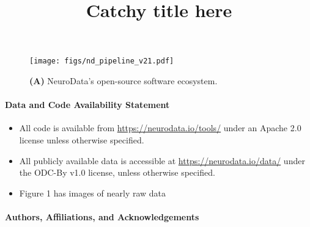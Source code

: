 \documentclass[11pt]{article}
\begin{document}
\title{Catchy title here}

\author{}

\maketitle
\thispagestyle{empty}

\noindent
\setcounter{tocdepth}{3}
\setcounter{secnumdepth}{1}

\vspace{-15pt}


\setcounter{page}{1}

\lipsum[1-3]

\begin{figure}[!h]
    \centering
        \texttt{[image: figs/nd\_pipeline\_v21.pdf]}
    \caption{
  \textbf{(A)}    NeuroData's open-source software ecosystem. 
    }
    \label{fig:1}
\end{figure}

\lipsum[3-5]



\paragraph{Data and Code Availability Statement}

\begin{itemize}
    \item All code is available from \url{https://neurodata.io/tools/} under an Apache 2.0 license unless otherwise specified.
	\item All publicly available data is accessible at \url{https://neurodata.io/data/} under the ODC-By v1.0 license, unless otherwise specified.
    \item Figure 1 has images of nearly raw data
\end{itemize}


\paragraph{Authors,  Affiliations, and Acknowledgements}

\nocite{*}

\vspace{5mm}


\end{document}
